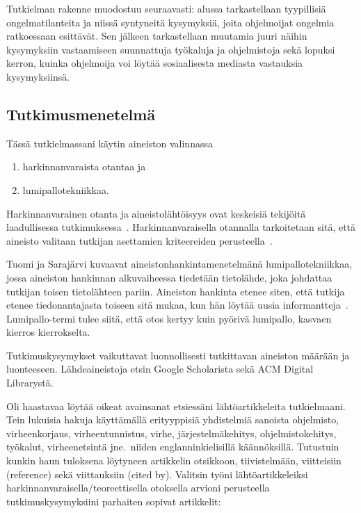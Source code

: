 \documentclass[finnish]{tktltiki2}
\theoremstyle{definition}
\theoremstyle{remark}
\begin{document}
Tutkielman rakenne muodostuu seuraavasti: alussa tarkastellaan tyypillisiä ongelmatilanteita ja niissä syntyneitä kysymyksiä, joita ohjelmoijat ongelmia ratkoessaan esittävät. Sen jälkeen tarkastellaan muutamia juuri näihin kysymyksiin vastaamiseen suunnattuja työkaluja ja ohjelmistoja sekä lopuksi kerron, kuinka ohjelmoija voi löytää sosiaalisesta mediasta vastauksia kysymyksiinsä.

\subsection{Tutkimusmenetelmä}

Tässä tutkielmassani käytin aineiston valinnassa
\begin{enumerate}
  \item harkinnanvaraista otantaa ja
  \item lumipallotekniikkaa.
\end{enumerate}

Harkinnanvarainen otanta ja aineistolähtöisyys ovat keskeisiä tekijöitä laadullisessa tutkimuksessa~\cite[s. 16-20]{laadullinen-tutkimus-ja-sisallonanalyysi}.
Harkinnanvaraisella otannalla tarkoitetaan sitä, että aineisto valitaan tutkijan asettamien kriteereiden perusteella~\cite{aineiston-maara-ja-tutkittavat}.

Tuomi ja Sarajärvi kuvaavat aineistonhankintamenetelmänä lumipallotekniikkaa, jossa aineiston hankinnan alkuvaiheessa tiedetään tietolähde, joka johdattaa tutkijan toisen tietolähteen pariin. Aineiston hankinta etenee siten, että tutkija etenee tiedonantajasta toiseen sitä mukaa, kun hän löytää uusia informantteja~\cite[s. 88]{johdatus-laadulliseen-tutkimukseen}. Lumipallo-termi tulee siitä, että otos kertyy kuin pyörivä lumipallo, kasvaen kierros kierrokselta.

Tutkimuskysymykset vaikuttavat luonnollisesti tutkittavan aineiston määrään ja luonteeseen. Lähdeaineistoja etsin Google Scholarista sekä ACM Digital Librarystä.

Oli haastavaa löytää oikeat avainsanat etsiessäni lähtöartikkeleita tutkielmaani. Tein lukuisia hakuja käyttämällä erityyppisiä yhdistelmiä sanoista ohjelmisto, virheenkorjaus, virheentunnistus, virhe, järjestelmäkehitys, ohjelmistokehitys, työkalut, virheenetsintä jne.\ niiden englanninkielisillä käännöksillä. Tutustuin kunkin haun tuloksena löytyneen artikkelin otsikkoon, tiivistelmään, viitteisiin (reference) sekä viittauksiin (cited by). Valitsin työni lähtöartikkeleiksi harkinnanvaraisella/teoreettisella otoksella arvioni perusteella tutkimuskysymyksiini parhaiten sopivat artikkelit:
\end{document}
